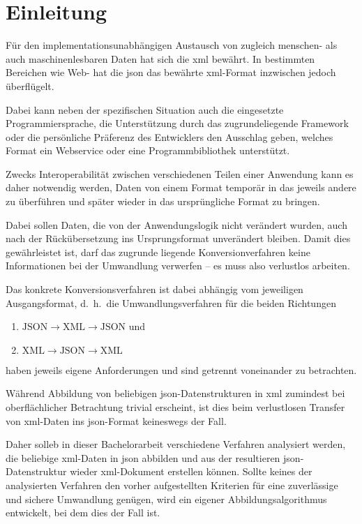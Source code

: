 \chapter{Einleitung} \label{chap:intro}
Für den implementationsunabhängigen Austausch von zugleich menschen- als auch
maschinenlesbaren Daten hat sich die \gls{xml}
bewährt. In bestimmten Bereichen wie Web- hat die \gls{json}
das bewährte \acrshort{xml}-Format inzwischen jedoch überflügelt.

Dabei kann neben der spezifischen Situation auch die eingesetzte
Programmiersprache, die Unterstützung durch das zugrundeliegende Framework
oder die persönliche Präferenz des Entwicklers den Ausschlag geben, welches
Format ein Webservice oder eine Programmbibliothek unterstützt.

Zwecks Interoperabilität zwischen verschiedenen Teilen einer Anwendung kann es
daher notwendig werden, Daten von einem Format temporär in das jeweils andere
zu überführen und später wieder in das ursprüngliche Format zu bringen.

Dabei sollen Daten, die von der Anwendungslogik nicht verändert wurden, auch
nach der Rückübersetzung ins Ursprungsformat unverändert bleiben. Damit dies
gewährleistet ist, darf das zugrunde liegende Konversionverfahren keine
Informationen bei der Umwandlung verwerfen -- es muss also verlustlos %
arbeiten.

Das konkrete Konversionsverfahren ist dabei abhängig vom jeweiligen
Ausgangsformat, d.~h.\ die Umwandlungsverfahren für die beiden Richtungen
\begin{enumerate}
    \item $\text{JSON} \rightarrow \text{XML} \rightarrow \text{JSON}$ und
    \item $\text{XML} \rightarrow \text{JSON} \rightarrow \text{XML}$
\end{enumerate}
haben jeweils eigene Anforderungen und sind getrennt voneinander zu betrachten.

Während Abbildung von beliebigen \acrshort{json}-Datenstrukturen in \acrshort{xml} zumindest bei
oberflächlicher Betrachtung trivial erscheint, ist dies beim verlustlosen
Transfer von \acrshort{xml}-Daten ins \acrshort{json}-Format keineswegs der Fall.

Daher solleb in dieser Bachelorarbeit verschiedene Verfahren analysiert
werden, die beliebige \acrshort{xml}-Daten in \acrshort{json} abbilden und aus der resultieren
\acrshort{json}-Datenstruktur wieder \acrshort{xml}-Dokument erstellen können. Sollte keines
der analysierten Verfahren den vorher aufgestellten Kriterien für eine
zuverlässige und sichere Umwandlung genügen, wird ein eigener
Abbildungsalgorithmus entwickelt, bei dem dies der Fall ist.

